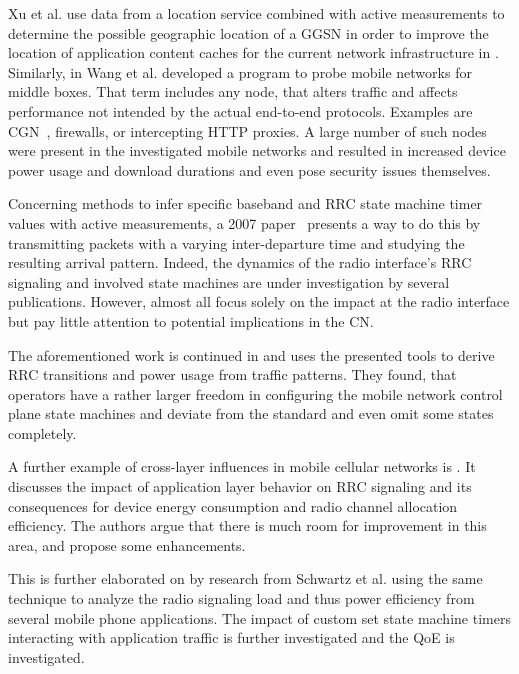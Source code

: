 Xu et al. use data from a location service combined with active measurements to determine the possible geographic location of a \gls{GGSN} in order to improve the location of application content caches for the current network infrastructure in \cite{Xu:2011:CDN:2007116.2007149}. Similarly, in \cite{sigcomm11middleboxes} Wang et al. developed a program to probe mobile networks for middle boxes. That term includes any node, that alters traffic and affects performance not intended by the actual end-to-end protocols. Examples are \gls{CGN}~\cite{rfc7021}, firewalls, or intercepting \gls{HTTP} proxies. A large number of such nodes were present in the investigated mobile networks and resulted in increased device power usage and download durations and even pose security issues themselves.

Concerning methods to infer specific baseband and \gls{RRC} state machine timer values with active measurements, a 2007 paper~\cite{4640935} presents a way to do this by transmitting packets with a varying inter-departure time and studying the resulting arrival pattern. Indeed, the dynamics of the radio interface's \gls{RRC} signaling and involved state machines are under investigation by several publications. However, almost all focus solely on the impact at the radio interface but pay little attention to potential implications in the \gls{CN}.

The aforementioned work is continued in \cite{5360763} and uses the presented tools to derive \gls{RRC} transitions and power usage from traffic patterns. They found, that operators have a rather larger freedom in configuring the mobile network control plane state machines and deviate from the standard and even omit some states completely.

A further example of cross-layer influences in mobile cellular networks is \cite{qian2011profiling}. It discusses the impact of application layer behavior on \gls{RRC} signaling and its consequences for device energy consumption and radio channel allocation efficiency. The authors argue that there is much room for improvement in this area, and propose some enhancements.

This is further elaborated on by research from Schwartz et al.\cite{schwartz2013angrybirds} using the same technique to analyze the radio signaling load and thus power efficiency from several mobile phone applications. The impact of custom set state machine timers interacting with application traffic is further investigated and the \gls{QoE} is investigated.


